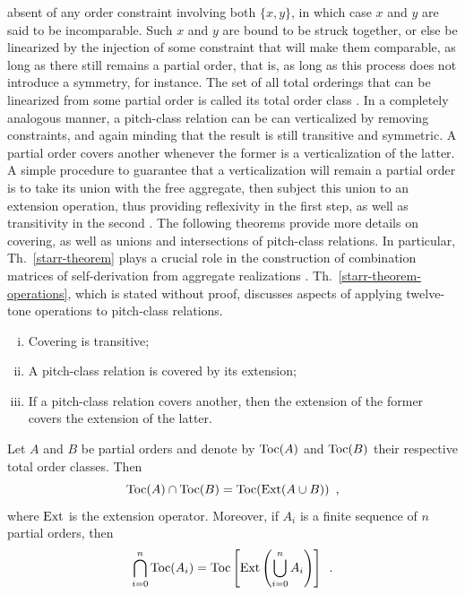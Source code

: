 absent of any order constraint involving both $\{ x, y \}$, in which case $x$ and $y$ are said to be incomparable. Such $x$ and $y$ are bound to be struck together, or else be linearized by the injection of some constraint that will make them comparable, as long as there still remains a partial order, that is, as long as this process does not introduce a symmetry, for instance. The set of all total orderings that can be linearized from some partial order is called its total order class \cite[188]{Starr1984}. In a completely analogous manner, a pitch-class relation can be can verticalized by removing constraints, and again minding that the result is still transitive and symmetric. A partial order covers another whenever the former is a verticalization of the latter. A simple procedure to guarantee that a verticalization will remain a partial order is to take its union with the free aggregate, then subject this union to an extension operation, thus providing reflexivity in the first step, as well as transitivity in the second \cite[192, 193]{Starr1984}. The following theorems provide more details on covering, as well as unions and intersections of pitch-class relations. In particular, Th.~\ref{starr-theorem} plays a crucial role in the construction of combination matrices of self-derivation from aggregate realizations \cite[222]{Starr1984}. Th.~\ref{starr-theorem-operations}, which is stated without proof, discusses aspects of applying twelve-tone operations to pitch-class relations.

\begin{theorem}
    \cite[193]{Starr1984}
    \begin{enumerate}[i.]
        \item Covering is transitive;
        \item A pitch-class relation is covered by its extension;
        \item If a pitch-class relation covers another, then the extension of the former covers the extension of the latter.
    \end{enumerate}
\end{theorem}

\begin{theorem}
    \cite[194]{Starr1984}
    \label{starr-theorem}
    Let $A$ and $B$ be partial orders and denote by $\operatorname{Toc}(A)$ and $\operatorname{Toc}(B)$ their respective total order classes. Then
    \begin{equation}
        \operatorname{Toc}(A) \cap \operatorname{Toc}(B) = \operatorname{Toc}(\operatorname{Ext}(A \cup B)) \enspace,
    \end{equation}
    where $\operatorname{Ext}$ is the extension operator. Moreover, if $A_i$ is a finite sequence of $n$ partial orders, then
    \begin{equation}
        \bigcap_{i = 0}^{n} \operatorname{Toc}(A_i) = \operatorname{Toc} \left[ \operatorname{Ext}\left ( \bigcup_{i = 0}^{n} A_i \right) \right] \enspace.
    \end{equation}
\end{theorem}

